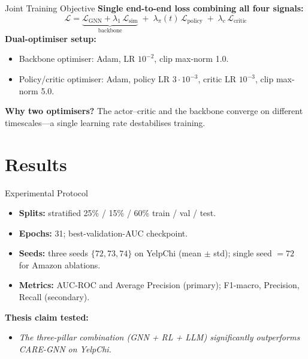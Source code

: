 \documentclass[aspectratio=169,10pt]{beamer}
\begin{document}
\begin{frame}{Joint Training Objective}
    \textbf{Single end-to-end loss combining all four signals:}
    \[
        \mathcal{L} =
        \underbrace{\mathcal{L}_{\text{GNN}} + \lambda_1\, \mathcal{L}_{\text{sim}}}_{\text{backbone}}
        \;+\; \lambda_\pi(t)\, \mathcal{L}_{\text{policy}}
        \;+\; \lambda_c\, \mathcal{L}_{\text{critic}}
    \]
    \vspace{0.4em}
    \textbf{Dual-optimiser setup:}
    \begin{itemize}
        \item Backbone optimiser: Adam, LR $10^{-2}$, clip max-norm 1.0.
        \item Policy/critic optimiser: Adam, policy LR $3\!\cdot\!10^{-3}$,
              critic LR $10^{-3}$, clip max-norm 5.0.
    \end{itemize}
    \vspace{0.4em}
    \textbf{Why two optimisers?} The actor--critic and the backbone converge on
    different timescales---a single learning rate destabilises training.
\end{frame}

\section{Results}

\begin{frame}{Experimental Protocol}
    \begin{itemize}
        \item \textbf{Splits:} stratified 25\% / 15\% / 60\% train / val / test.
        \item \textbf{Epochs:} 31; best-validation-AUC checkpoint.
        \item \textbf{Seeds:} three seeds $\{72, 73, 74\}$ on YelpChi (mean $\pm$ std);
              single seed $=72$ for Amazon ablations.
        \item \textbf{Metrics:} AUC-ROC and Average Precision (primary); F1-macro,
              Precision, Recall (secondary).
    \end{itemize}
    \vspace{0.6em}
    \textbf{Thesis claim tested:}
    \begin{itemize}
        \item[] \emph{The three-pillar combination (GNN + RL + LLM) significantly
              outperforms CARE-GNN on YelpChi.}
    \end{itemize}
\end{frame}
\end{document}
